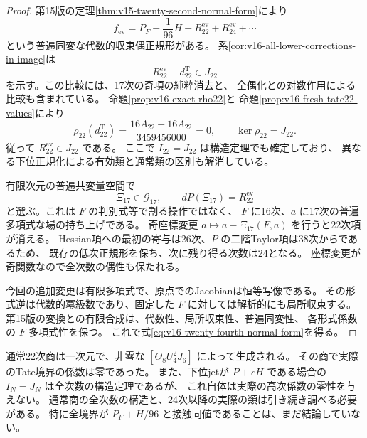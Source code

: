 \begin{proof}
第15版の定理\ref{thm:v15-twenty-second-normal-form}により
\[
 f_{\mathrm{ev}}=P_F+\frac1{96}H+R_{22}^{\mathrm{ev}}
                             +R_{24}^{\mathrm{ev}}+\cdots
\]
という普遍同変な代数的収束偶正規形がある。
系\ref{cor:v16-all-lower-corrections-in-image}は
\[
 R_{22}^{\mathrm{ev}}-d_{22}^{\mathrm T}\in J_{22}
\]
を示す。この比較には、17次の奇項の純粋消去と、
全偶化との対数作用による比較も含まれている。
命題\ref{prop:v16-exact-rho22}と
命題\ref{prop:v16-fresh-tate22-values}により
\[
 \rho_{22}(d_{22}^{\mathrm T})
   =\frac{16A_{22}-16A_{22}}{3459456000}=0,
 \qquad\ker\rho_{22}=J_{22}.
\]
従って $R_{22}^{\mathrm{ev}}\in J_{22}$ である。
ここで $I_{22}=J_{22}$ は構造定理でも確定しており、
異なる下位正規化による有効類と通常類の区別も解消している。

有限次元の普遍共変量空間で
\[
 \Xi_{17}\in\mathcal G_{17},\qquad
                       dP(\Xi_{17})=R_{22}^{\mathrm{ev}}
\]
と選ぶ。これは $F$ の判別式等で割る操作ではなく、
$F$ に16次、$a$ に17次の普遍多項式な場の持ち上げである。
奇座標変更 $a\mapsto a-\Xi_{17}(F,a)$ を行うと22次項が消える。
Hessian項への最初の寄与は26次、$P$ の二階Taylor項は38次からであるため、
既存の低次正規形を保ち、次に残り得る次数は24となる。
座標変更が奇関数なので全次数の偶性も保たれる。

今回の追加変更は有限多項式で、原点でのJacobianは恒等写像である。
その形式逆は代数的冪級数であり、固定した $F$ に対しては解析的にも局所収束する。
第15版の変換との有限合成は、代数性、局所収束性、普遍同変性、
各形式係数の $F$ 多項式性を保つ。
これで式\eqref{eq:v16-twenty-fourth-normal-form}を得る。
\end{proof}

\begin{remark}[確定した商と残る課題]
通常22次商は一次元で、非零な $[\Theta_8U_4^2J_6]$ によって生成される。
その商で実際のTate境界の係数は零であった。
また、下位jetが $P+cH$ である場合の $I_N=J_N$ は全次数の構造定理であるが、
これ自体は実際の高次係数の零性を与えない。
通常商の全次数の構造と、24次以降の実際の類は引き続き調べる必要がある。
特に全境界が $P_F+H/96$ と接触同値であることは、まだ結論していない。
\end{remark}


\clearpage

